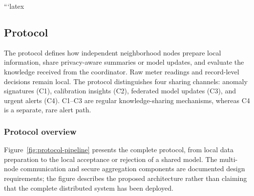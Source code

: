 \documentclass[11pt,a4paper]{article}
\begin{document}
```latex
\subsection{Protocol}
\label{subsec:protocol}

The protocol defines how independent neighborhood nodes prepare local
information, share privacy-aware summaries or model updates, and evaluate
the knowledge received from the coordinator. Raw meter readings and
record-level decisions remain local. The protocol distinguishes four
sharing channels: anomaly signatures (C1), calibration insights (C2),
federated model updates (C3), and urgent alerts (C4). C1--C3 are regular
knowledge-sharing mechanisms, whereas C4 is a separate, rare alert path.

\subsubsection{Protocol overview}

Figure~\ref{fig:protocol-pipeline} presents the complete protocol, from
local data preparation to the local acceptance or rejection of a shared
model. The multi-node communication and secure aggregation components
are documented design requirements; the figure describes the proposed
architecture rather than claiming that the complete distributed system
has been deployed.
\end{document}
